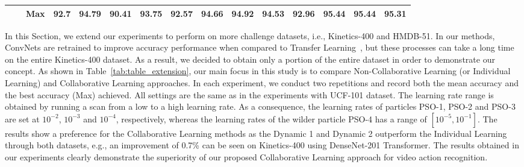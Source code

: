 \documentclass[fleqn,10pt]{wlscirep}
\begin{document}
\begin{table}[htb]
{\begin{tabular}{lll|clll|clllllll|}
\multicolumn{1}{|l|}{}                              & \multicolumn{1}{l|}{}                                                                                    & Max & \multicolumn{1}{l|}{92.7}                                                  & \multicolumn{1}{l|}{\textbf{94.79}}                                                 & \multicolumn{1}{l|}{90.41}                                                 & 93.75                                                                      & \multicolumn{1}{l|}{92.57}                                                 & \multicolumn{1}{l|}{94.66}                                                 & \multicolumn{1}{l|}{\textbf{94.92}}                                                 & \multicolumn{1}{l|}{94.53}                                                 & \multicolumn{1}{l|}{92.96}                                                 & \multicolumn{1}{l|}{\textbf{95.44}}                                                 & \multicolumn{1}{l|}{95.44}                                                 & 95.31                                                                      \\ \hline
\end{tabular}
}
\end{table} In this Section, we extend our experiments to perform on more challenge datasets, i.e., Kinetics-400 and HMDB-51. In our methods, ConvNets are retrained to improve accuracy performance when compared to Transfer Learning~\cite{phong2022pso,phong2020rethinking}, but these processes can take a long time on the entire Kinetics-400 dataset. As a result, we decided to obtain only a portion of the entire dataset in order to demonstrate our concept. As shown in Table~\ref{tab:table_extension}, our main focus in this study is to compare Non-Collaborative Learning (or Individual Learning) and Collaborative Learning approaches. In each experiment, we conduct two repetitions and record both the mean accuracy and the best accuracy (Max) achieved. All settings are the same as in the experiments with UCF-101 dataset. The learning rate range is obtained by running a scan from a low to a high learning rate. As a consequence, the learning rates of particles PSO-1, PSO-2 and PSO-3 are set at $10^{-2}$, $10^{-3}$ and $10^{-4}$, respectively, whereas the learning rates of the wilder particle PSO-4 has a range of $[10^{-5},10^{-1}]$. The results show a preference for the Collaborative Learning methods as the Dynamic 1 and Dynamic 2 outperform the Individual Learning through both datasets, e.g., an improvement of 0.7\% can be seen on Kinetics-400 using DenseNet-201 Transformer. The results obtained in our experiments clearly demonstrate the superiority of our proposed Collaborative Learning approach for video action recognition.
\end{document}
